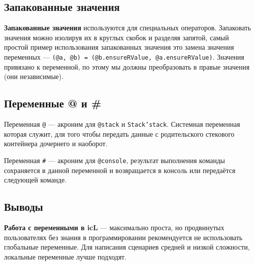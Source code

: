 \subsection{Запакованные значения}

{\bf Запакованные значения} используются для специальных операторов. Запаковать значения можно изолируя их в круглых скобок и разделяя запятой, самый простой пример использования запакованных значения это замена значения переменных — \texttt{(@a, @b) = (@b.ensureRValue, @a.ensureRValue)}. Значения привязано к переменной, по этому мы должны преобразовать в правые значения (они независимые).

\subsection{Переменные @ и \#}

{Переменная \texttt{@}} — акроним для \texttt{@stack} и \texttt{Stack'stack}. Системная переменная которая служит, для того чтобы передать данные с родительского стекового контейнера дочернего и наоборот. 

{Переменная \texttt{#}} — акроним для \texttt{@console}, результат выполнения команды сохраняется в данной переменной и возвращается в консоль или передаётся следующей команде.

\subsection{Выводы}

{\bf Работа с переменными в icL} — максимально проста, но продвинутых пользователях без знания в программировании рекомендуется не использовать глобальные переменные. Для написания сценариев средней и низкой сложности, локальные переменные лучше подходят.
